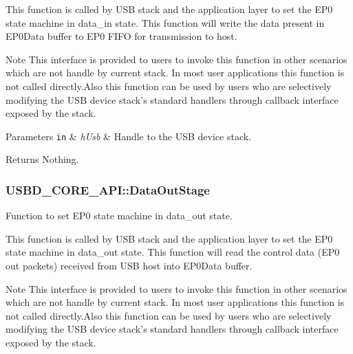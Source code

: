 This function is called by U\-S\-B stack and the application layer to set the E\-P0 state machine in data\-\_\-in state. This function will write the data present in E\-P0\-Data buffer to E\-P0 F\-I\-F\-O for transmission to host. \par
\begin{DoxyNote}{Note}
This interface is provided to users to invoke this function in other scenarios which are not handle by current stack. In most user applications this function is not called directly.\-Also this function can be used by users who are selectively modifying the U\-S\-B device stack's standard handlers through callback interface exposed by the stack.
\end{DoxyNote}

\begin{DoxyParams}[1]{Parameters}
\mbox{\tt in}  & {\em h\-Usb} & Handle to the U\-S\-B device stack. \\
\hline
\end{DoxyParams}
\begin{DoxyReturn}{Returns}
Nothing. 
\end{DoxyReturn}
\hypertarget{structUSBD__CORE__API_ac4232f616e5ec409d0ca853bf704175f}{
\subsubsection[{Data\-Out\-Stage}]{ U\-S\-B\-D\-\_\-\-C\-O\-R\-E\-\_\-\-A\-P\-I\-::\-Data\-Out\-Stage}}\label{structUSBD__CORE__API_ac4232f616e5ec409d0ca853bf704175f}
Function to set E\-P0 state machine in data\-\_\-out state.

This function is called by U\-S\-B stack and the application layer to set the E\-P0 state machine in data\-\_\-out state. This function will read the control data (E\-P0 out packets) received from U\-S\-B host into E\-P0\-Data buffer. \par
\begin{DoxyNote}{Note}
This interface is provided to users to invoke this function in other scenarios which are not handle by current stack. In most user applications this function is not called directly.\-Also this function can be used by users who are selectively modifying the U\-S\-B device stack's standard handlers through callback interface exposed by the stack.
\end{DoxyNote}


